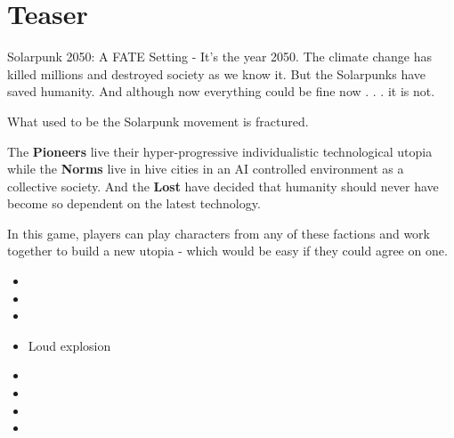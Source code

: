 \section{Teaser}

Solarpunk 2050: A FATE Setting - It's the year 2050. The climate change has killed millions and destroyed society as we know it. But the Solarpunks have saved humanity. And although now everything could be fine now . . . it is not.

What used to be the Solarpunk movement is fractured.

The \textbf{Pioneers} live their hyper-progressive individualistic technological utopia while the \textbf{Norms} live in hive cities in an AI controlled environment as a collective society. And the \textbf{Lost} have decided that humanity should never have become so dependent on the latest technology.

In this game, players can play characters from any of these factions and work together to build a new utopia - which would be easy if they could agree on one.

\begin{normtalk}[title=the Mission]
    \begin{itemize}
        \item {}
        \item {}
        \item {}
        \item Loud explosion
        \item {}
        \item {}
        \item {}
        \item {}
    \end{itemize}
\end{normtalk}